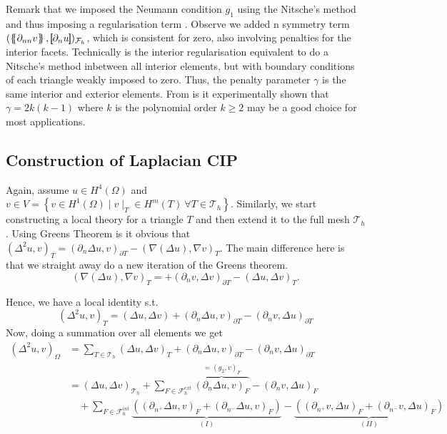 \begin{remark}
Remark that we imposed the Neumann condition $g_{1}$ using the Nitsche's method and thus imposing a regularisation term \cite{nitsche1971variationsprinzip}. Observe we added n symmetry term $( \mean{ \partial _{n n} v }, \jump{ \partial _{n}u }      )_{\mathcal{F}_{h}}$,
which is consistent for zero, also involving penalties for the interior facets. Technically is the interior regularisation equivalent to do a Nitsche's method inbetween all interior elements, but with boundary conditions of each triangle weakly
imposed to zero. Thus, the penalty parameter $\gamma$  is the same interior and exterior elements. From \cite{brenner2012quadratic, brenner2012} is it experimentally shown that $\gamma = 2k ( k-1 ) $ where $k$ is the polynomial order $k\ge 2$ may be
a good choice for most applications.
\end{remark}


\subsection{Construction of Laplacian CIP}%
\label{sub:construction_of_laplacian_cip}

 Again, assume $u \in H^{4}( \Omega ) $ and $ v \in  V = \left\{ v \in H^{1}( \Omega )  \mid  v \mid _{T} \in H^{m}( T) \ \forall T \in \mathcal{T} _{h}   \right\} $. Similarly, we start constructing a local theory for a triangle $T$ and then extend it to the full mesh
$\mathcal{T}_{h} $. Using Greens Theorem is it obvious that \(
\left( \Delta ^2 u,v \right) _{T }   = ( \partial _{n} \Delta u, v ) _{\partial T  } - ( \nabla \left( \Delta  u \right) , \nabla v ) _{T }
\).
The main difference here is that we straight away do a new iteration of the Greens theorem.
\begin{equation*}
( \nabla ( \Delta u ) , \nabla v ) _{T }  =  + ( \partial _{n}v , \Delta v)_{\partial T} - ( \Delta u, \Delta v ) _{T}
.\end{equation*}

Hence, we have a local identity s.t. \[
( \Delta ^2 u, v ) _{T} = ( \Delta u, \Delta v) +  ( \partial _{n} \Delta u, v)_{\partial T} - ( \partial _{n} v, \Delta u) _{\partial T}
\]
Now, doing a summation over all elements we get \[
    \begin{split}
( \Delta ^2 u, v ) _{\Omega } & = \sum_{T \in \mathcal{T}_{h} }^{}  ( \Delta u, \Delta v)_{T}
+  ( \partial _{n} \Delta u, v)_{\partial T} - ( \partial _{n} v, \Delta u) _{\partial T} \\
 & =   ( \Delta u, \Delta v)_{\mathcal{T} _{h}} +  \sum_{F \in \mathcal{F}_{h}^{ext} }^{}
  \overbrace{( \partial _{n} \Delta u, v)_{ F}}^{=( g_{2},v)_{F} }  - ( \partial _{n} v, \Delta u) _{F} \\
  &   \quad + \sum_{F \in \mathcal{F}_{h}^{int} }^{} \underbrace{( ( \partial _{n^{+}} \Delta u, v)_{ F} + ( \partial _{n^{-}} \Delta u, v)_{ F} )}_{(I)}  - \underbrace{( ( \partial _{n^{+}} v, \Delta u) _{F} + ( \partial _{n^{-}} v, \Delta u) _{F}
  )}_{(II)}   \\
    \end{split}
\]

